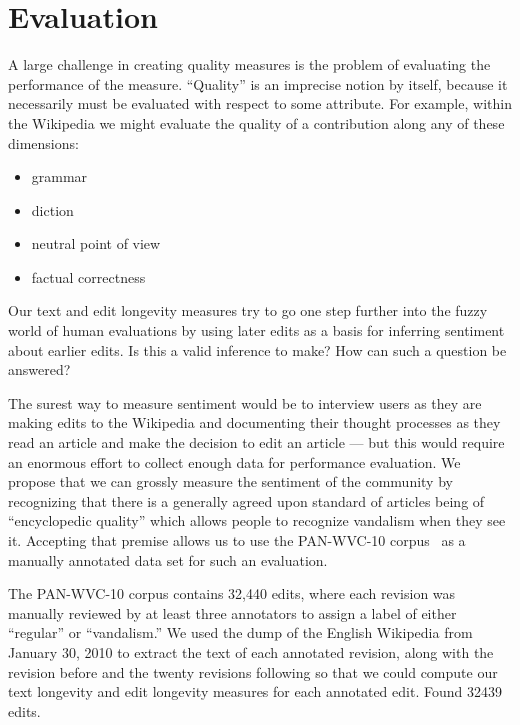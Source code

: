 \section{Evaluation}


A large challenge in creating quality measures is the
problem of evaluating the performance of the measure.
``Quality'' is an imprecise notion by itself, because it
necessarily must be evaluated with respect to some attribute.
For example, within the Wikipedia we might evaluate the quality
of a contribution along any of these dimensions:
\begin{itemize}
\item grammar
\item diction
\item neutral point of view
\item factual correctness
\end{itemize}
Our text and edit longevity measures try to go one step
further into the fuzzy world of human evaluations by using
later edits as a basis for inferring sentiment about earlier edits.
Is this a valid inference to make?
How can such a question be answered?

The surest way to measure sentiment would be to interview
users as they are making edits to the Wikipedia and documenting
their thought processes as they read an article and make the
decision to edit an article --- but this would require an enormous
effort to collect enough data for performance evaluation.
We propose that we can grossly measure the sentiment of the
community by recognizing that there is a generally agreed upon
standard of articles being of ``encyclopedic quality''
which allows people to recognize vandalism when they see it.
Accepting that premise allows us to use the PAN-WVC-10
corpus~\cite{Potthast2010a} as a manually annotated data set for
such an evaluation.

The PAN-WVC-10 corpus contains 32,440 edits, where each revision was
manually reviewed by at least three annotators to assign a label
of either ``regular'' or ``vandalism.''
We used the dump of the English Wikipedia from January 30, 2010
to extract the text of each annotated revision, along with the revision
before and the twenty revisions following so that we could compute
our text longevity and edit longevity measures for each annotated edit.
Found 32439 edits.


